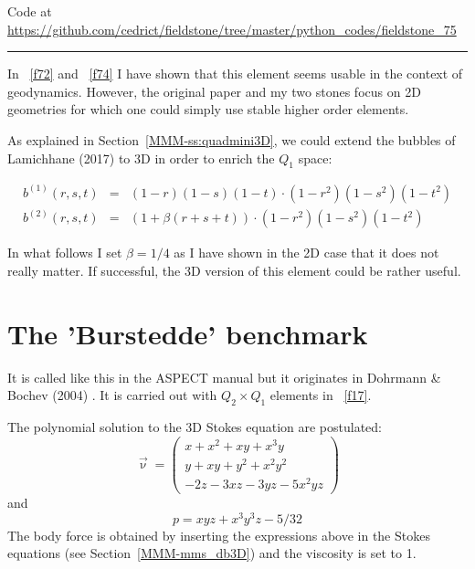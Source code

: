 

\begin{center}
Code at \url{https://github.com/cedrict/fieldstone/tree/master/python_codes/fieldstone_75}
\end{center}

\par\noindent\rule{\textwidth}{0.4pt}


In \stone~\ref{f72} and \stone~\ref{f74} I have shown that this element
seems usable in the context of geodynamics. However, the original paper 
and my two stones focus on 2D geometries for which one could simply use 
stable higher order elements.

As explained in Section~\ref{MMM-ss:quadmini3D}, we could extend the bubbles 
of Lamichhane (2017) \cite{lami17} to 3D in order to enrich the $Q_1$ space:

\begin{eqnarray}
b^{(1)} (r,s,t) &=& (1-r)(1-s)(1-t) \cdot (1-r^2) (1-s^2) (1-t^2) \\
b^{(2)} (r,s,t) &=& (1 + \beta(r+s+t)) \cdot (1-r^2) (1-s^2) (1-t^2) 
\end{eqnarray}

In what follows I set $\beta=1/4$ as I have shown in the 2D case that it does not really matter. 
If successful, the 3D version of this element could be rather useful.

\section*{The 'Burstedde' benchmark} It is called like this in the ASPECT manual 
but it originates in Dohrmann \& Bochev (2004) \cite{dobo04}. It is carried 
out with $Q_2 \times Q_1$ elements in \stone~\ref{f17}. 

The polynomial solution to the 3D Stokes equation are postulated:
\begin{equation}
\vec{\upnu}
=
\left(
\begin{array}{c}
x+x^2+xy+x^3y \\
y + xy + y^2 + x^2 y^2\\
-2z - 3xz - 3yz - 5x^2 yz
\end{array}
\right)
\end{equation}
and
\begin{equation}
p = xyz + x^3 y^3z - 5/32
\end{equation}
The body force is obtained by inserting the expressions above in the Stokes equations
(see Section~\ref{MMM-mms_db3D}) and the viscosity is set to 1.

